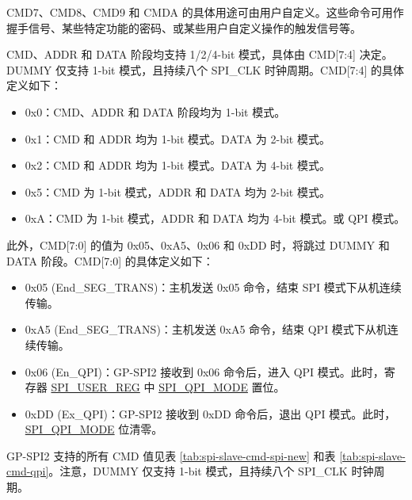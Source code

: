 \documentclass[main\_\_CN.tex]{subfiles}
\begin{document}
CMD7、CMD8、CMD9 和 CMDA 的具体用途可由用户自定义。这些命令可用作握手信号、某些特定功能的密码、或某些用户自定义操作的触发信号等。

CMD、ADDR 和 DATA 阶段均支持 1/2/4-bit 模式，具体由 CMD[7:4] 决定。DUMMY 仅支持 1-bit 模式，且持续八个 SPI\_CLK 时钟周期。CMD[7:4] 的具体定义如下：

\begin{itemize}
    \item 0x0：CMD、ADDR 和 DATA 阶段均为 1-bit 模式。
    \item 0x1：CMD 和 ADDR 均为 1-bit 模式。DATA 为 2-bit 模式。
    \item 0x2：CMD 和 ADDR 均为 1-bit 模式。DATA 为 4-bit 模式。
    \item 0x5：CMD 为 1-bit 模式，ADDR 和 DATA 均为 2-bit 模式。
    \item 0xA：CMD 为 1-bit 模式，ADDR 和 DATA 均为 4-bit 模式。或 QPI 模式。
\end{itemize}

此外，CMD[7:0] 的值为 0x05、0xA5、0x06 和 0xDD 时，将跳过 DUMMY 和 DATA 阶段。CMD[7:0] 的具体定义如下：

\begin{itemize}
    \item \label{cmd:ENDSEGTRANS}0x05 (End\_SEG\_TRANS)：主机发送 0x05 命令，结束 SPI 模式下从机连续传输。
    \item 0xA5 (End\_SEG\_TRANS)：主机发送 0xA5 命令，结束 QPI 模式下从机连续传输。
    \item 0x06 (En\_QPI)：GP-SPI2 接收到 0x06 命令后，进入 QPI 模式。此时，寄存器 \hyperref[regdesc:SPIUSERREG]{SPI\_USER\_REG} 中 \hyperref[fielddesc:SPIQPIMODE]{SPI\_QPI\_MODE} 置位。
    \item 0xDD (Ex\_QPI)：GP-SPI2 接收到 0xDD 命令后，退出 QPI 模式。此时， \hyperref[fielddesc:SPIQPIMODE]{SPI\_QPI\_MODE} 位清零。
\end{itemize}


GP-SPI2 支持的所有 CMD 值见表 \ref{tab:spi-slave-cmd-spi-new} 和表 \ref{tab:spi-slave-cmd-qpi}。注意，DUMMY 仅支持 1-bit 模式，且持续八个 SPI\_CLK 时钟周期。
\end{document}
